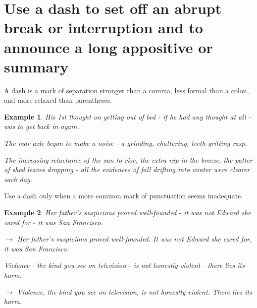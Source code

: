 \documentclass{book}
\numberwithin{equation}{section}
\newtheorem{example}{Example}[chapter]
\begin{document}
\section{Use a dash to set off an abrupt break or interruption and to announce a long appositive or summary}
A dash is a mark of separation stronger than a comma, less formal than a colon, and more relaxed than parentheses.
\begin{example}
    His 1st thought on getting out of bed - if he had any thought at all - was to get back in again.
    
    The rear axle began to make a noise - a grinding, chattering, teeth-gritting rasp.
    
    The increasing reluctance of the sun to rise, the extra nip in the breeze, the patter of shed leaves dropping - all the evidences of fall drifting into winter were clearer each day.
\end{example}
Use a dash only when a more common mark of punctuation seems inadequate.
\begin{example}
    Her father's suspicions proved well-founded - it was not Edward she cared for - it was San Francisco.
    
    $\to$ Her father's suspicions proved well-founded. It was not Edward she cared for, it was San Francisco.
    
    Violence - the kind you see on television - is not honestly violent - there lies its harm.
    
    $\to$ Violence, the kind you see on television, is not honestly violent. There lies its harm.
\end{example}
\end{document}
